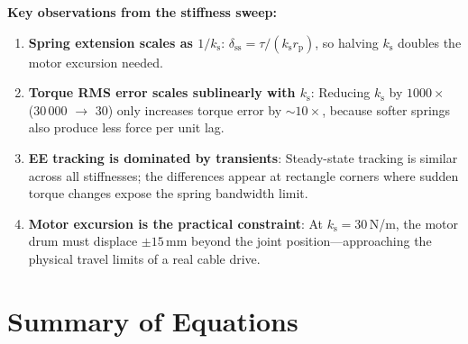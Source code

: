 \documentclass[11pt,a4paper]{article}
\newcommand{\rp}{r_{\mathrm{p}}}
\newcommand{\ks}{k_{\mathrm{s}}}
\begin{document}
\begin{resultbox}
\textbf{Key observations from the stiffness sweep:}
\begin{enumerate}[leftmargin=2em]
    \item \textbf{Spring extension scales as $1/\ks$}: $\delta_{\mathrm{ss}} = \tau / (\ks \rp)$, so halving $\ks$ doubles the motor excursion needed.
    \item \textbf{Torque RMS error scales sublinearly with $\ks$}: Reducing $\ks$ by $1000\times$ (30\,000 $\to$ 30) only increases torque error by $\sim 10\times$, because softer springs also produce less force per unit lag.
    \item \textbf{EE tracking is dominated by transients}: Steady-state tracking is similar across all stiffnesses; the differences appear at rectangle corners where sudden torque changes expose the spring bandwidth limit.
    \item \textbf{Motor excursion is the practical constraint}: At $\ks = 30$\,N/m, the motor drum must displace $\pm 15$\,mm beyond the joint position---approaching the physical travel limits of a real cable drive.
\end{enumerate}
\end{resultbox}


\section{Summary of Equations}
\label{sec:summary}
\end{document}
